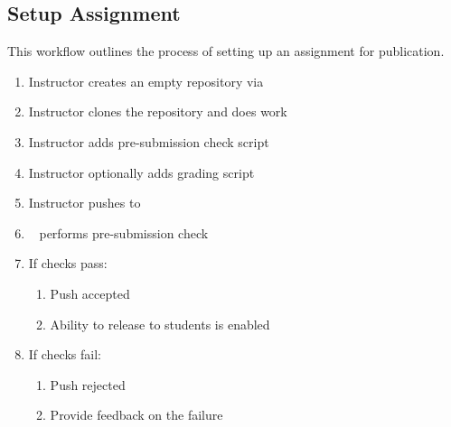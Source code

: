 \subsection{Setup Assignment}
\label{wf_assignment_setup}
This workflow outlines the process of setting up an assignment for publication.
\begin{enumerate}
\item Instructor creates an empty repository via \acronym
\item Instructor clones the repository and does work
\item Instructor adds pre-submission check script
\item Instructor optionally adds grading script
\item Instructor pushes to \acronym
\item \acronym~ performs pre-submission check
\item If checks pass:
    \begin{enumerate}
    \item Push accepted
    \item Ability to release to students is enabled
    \end{enumerate}
\item If checks fail:
    \begin{enumerate}
    \item Push rejected
    \item Provide feedback on the failure
    \end{enumerate}
\end{enumerate}

